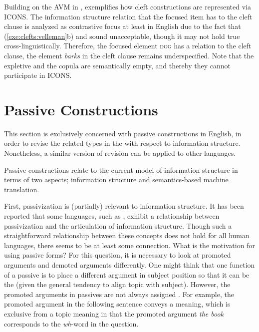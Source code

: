 Building on the AVM in ,
 exemplifies how cleft constructions are represented
via ICONS.  The information structure relation that the focused item
has to the cleft clause is analyzed as contrastive focus at least in
English due to the fact that (\ref{exe:clefts:velleman}b) and
 sound unacceptable, though it may not hold true
cross-linguistically. Therefore, the focused element \textsc{dog} has
a  relation to the cleft clause, the element
\textit{barks} in the cleft clause remains underspecified.  Note that
the expletive \textit{} and the copula \textit{}
are semantically empty, and thereby they cannot participate in ICONS.





\section{Passive Constructions}
\label{10:sec:passive}

This section is exclusively concerned with passive constructions in
English, in order to revise the related types in the  with
respect to information structure. Nonetheless, a similar version of
revision can be applied to other languages.


Passive constructions relate to the current model of information
structure in terms of two aspects; information structure and
semantics-based machine translation.


First, passivization is (partially) relevant to information
structure. It has been reported that some languages, such as
 \citep{casielles:03}, exhibit a relationship between
passivization and the articulation of information structure. Though
such a straightforward relationship between these concepts does not
hold for all human languages, there seems to be at least some
connection.  What is the motivation for using passive
forms? For this question, it is necessary to look at
promoted arguments and demoted arguments differently.  One might think
that one function of a passive is to place a different argument in
subject position so that it can be the  (given the general
tendency to align topic with subject). However, the promoted arguments
in passives are not always assigned . For example, the
promoted argument in the following sentence conveys a 
meaning, which is exclusive from a topic meaning in that the promoted
argument \textit{the book} corresponds to the \textit{wh}-word in the
question.


